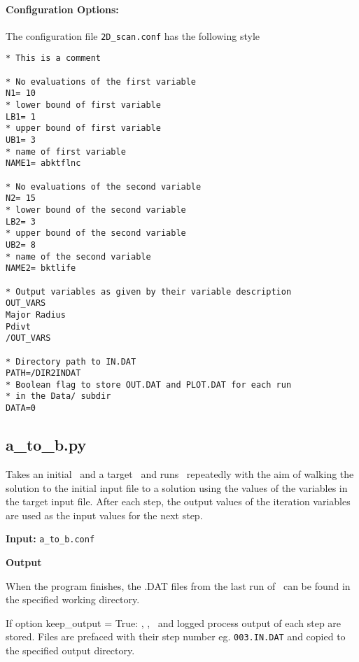 \paragraph{Configuration Options:}

The configuration file \texttt{2D\_scan.conf} has the following style
\begin{framed}
\begin{verbatim}
* This is a comment

* No evaluations of the first variable
N1= 10
* lower bound of first variable
LB1= 1
* upper bound of first variable
UB1= 3
* name of first variable
NAME1= abktflnc

* No evaluations of the second variable
N2= 15
* lower bound of the second variable
LB2= 3
* upper bound of the second variable
UB2= 8
* name of the second variable
NAME2= bktlife

* Output variables as given by their variable description
OUT_VARS
Major Radius
Pdivt
/OUT_VARS

* Directory path to IN.DAT
PATH=/DIR2INDAT
* Boolean flag to store OUT.DAT and PLOT.DAT for each run
* in the Data/ subdir
DATA=0
\end{verbatim}
\end{framed}

\subsection{a\_to\_b.py}

Takes an initial \indat\ and a target \indat\ and runs \process\ repeatedly
with the aim of walking the solution to the initial input file to a solution
using the values of the variables in the target input file.  After each step,
the output values of the iteration variables are used as the input values for
the next step.

\begin{description}
\item{\textbf{Input:}}
\texttt{a\_to\_b.conf}

\item{\textbf{Output}} 

When the program finishes, the .DAT files from the last run of \process\ can
be found in the specified working directory.

If option keep\_output = True: \indat, \outdat, \mfile\ and logged process
output of each step are stored. Files are prefaced with their step number
eg. \texttt{003.IN.DAT} and copied to the specified output directory.

\end{description}

